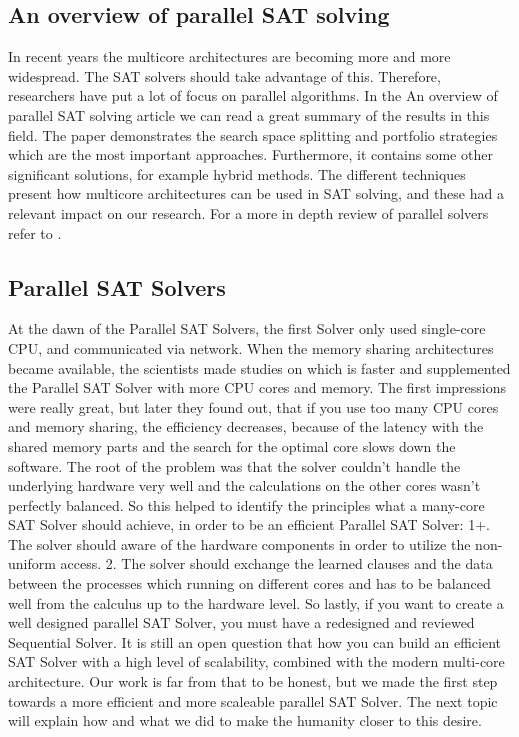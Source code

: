 \documentclass{article}
\begin{document}
\subsection{An overview of parallel SAT solving}

In recent years the multicore architectures are becoming more and more wide\-spread. The SAT solvers should take advantage of this. Therefore, researchers have put a lot of focus on parallel algorithms. In the An overview of parallel SAT solving article we can read a great summary of the results in this field. The paper demonstrates the search space splitting and portfolio strategies which are the most important approaches. Furthermore, it contains some other significant solutions, for example hybrid methods. The different techniques present how multicore architectures can be used in SAT solving, and these had a relevant impact on our research. For a more in depth review of parallel solvers refer to \cite{paralellSAT}.


\subsection{Parallel SAT Solvers}

At the dawn of the Parallel SAT Solvers, the first Solver only used single-core CPU, and communicated via network. When the memory sharing architectures became available, the scientists made studies on which is faster and supplemented the Parallel SAT Solver with more CPU cores and memory. The first impressions were really great, but later they found out, that if you use too many CPU cores and memory sharing, the efficiency decreases, because of the latency with the shared memory parts and the search for the optimal core slows down the software. The root of the problem was that the solver couldn't handle the underlying hardware very well and the calculations on the other cores wasn't perfectly balanced. So this helped to identify the principles what a many-core SAT Solver should achieve, in order to be an efficient Parallel SAT Solver:
1+. The solver should aware of the hardware components in order to utilize the non-uniform access.
2. The solver should exchange the learned clauses and the data between the processes which running on different cores and has to be balanced well from the calculus up to the hardware level.
So lastly, if you want to create a well designed parallel SAT Solver, you must have a redesigned and reviewed Sequential Solver. It is still an open question that how you can build an efficient SAT Solver with a high level of scalability, combined with the modern multi-core architecture.
Our work is far from that to be honest, but we made the first step towards a more efficient and more scaleable parallel SAT Solver. The next topic will explain how and what we did to make the humanity closer to this desire.
\end{document}
